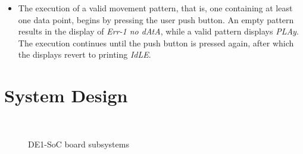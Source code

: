 \documentclass[]{article}
\begin{document}
\begin{itemize}
    \item The execution of a valid movement pattern, that is, one containing at least one data point, begins by pressing the user push button. An empty pattern results in the display of \emph{Err-1 no dAtA}, while a valid pattern displays \emph{PLAy}. The execution continues until the push button is pressed again, after which the displays revert to printing \emph{IdLE}.
\end{itemize}

\section{System Design}\label{sec:sys_design}

\begin{figure}
    \centering
    \\
    \caption{DE1-SoC board subsystems}
    \label{fig:de1_soc}
\end{figure}
\end{document}
